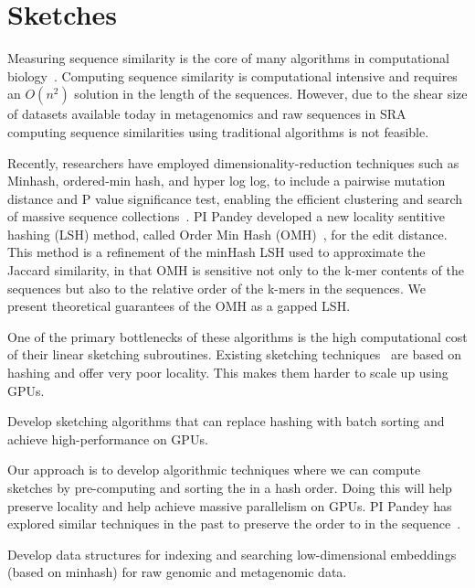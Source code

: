 \section{Sketches}

Measuring sequence similarity is the core of many algorithms in computational biology~\cite{Myers2000, Langmead2012,Li2010}. Computing sequence similarity is computational intensive and requires an $O(n^2)$ solution in the length of the sequences. However, due to the shear size of datasets available today in metagenomics and raw sequences in SRA computing sequence similarities using traditional algorithms is not feasible.

Recently, researchers have employed dimensionality-reduction techniques such as Minhash, ordered-min hash, and hyper log log, to include a pairwise mutation distance and P value significance test, enabling the efficient clustering and search of massive sequence collections~\cite{Mitzenmacher2014,ondov2016mash,Marais2019,Baker2019}. PI Pandey developed a new locality sentitive hashing (LSH) method, called Order Min Hash (OMH)~\cite{Marais2019}, for the edit distance. This method is a refinement of the minHash LSH used to approximate the Jaccard similarity, in that OMH is sensitive not only to the k-mer contents of the sequences but also to the relative order of the k-mers in the sequences. We present theoretical guarantees of the OMH as a gapped LSH.

One of the primary bottlenecks of these algorithms is the high computational cost of their linear sketching subroutines. Existing sketching techniques~\cite{ondov2016mash,Marais2019} are based on hashing and offer very poor locality. This makes them harder to scale up using GPUs.

\begin{rproblem}
Develop sketching algorithms that can replace hashing with batch sorting and achieve high-performance on GPUs.
\end{rproblem}

Our approach is to develop algorithmic techniques where we can compute sketches by pre-computing and sorting the \kmers in a hash order. Doing this will help preserve locality and help achieve massive parallelism on GPUs. PI Pandey has explored similar techniques in the past to preserve the order to \kmers in the sequence~\cite{Marais2019}.

\begin{rproblem}
Develop data structures for indexing and searching low-dimensional embeddings (based on minhash) for raw genomic and metagenomic data.
\end{rproblem}

